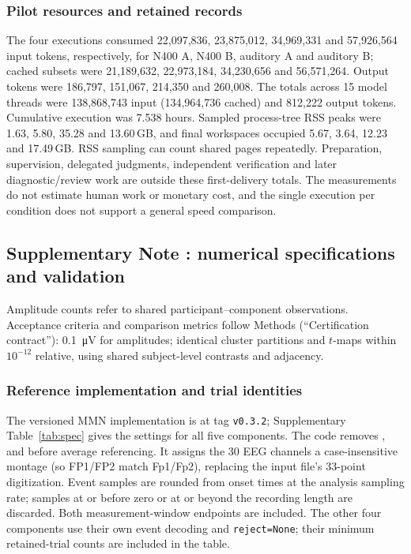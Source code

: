 \subsubsection*{Pilot resources and retained records}

The four executions consumed 22,097,836, 23,875,012, 34,969,331 and 57,926,564 input tokens, respectively, for N400 A, N400 B, auditory A and auditory B; cached subsets were 21,189,632, 22,973,184, 34,230,656 and 56,571,264. Output tokens were 186,797, 151,067, 214,350 and 260,008. The totals across 15 model threads were 138,868,743 input (134,964,736 cached) and 812,222 output tokens. Cumulative execution was 7.538 hours. Sampled process-tree RSS peaks were 1.63, 5.80, 35.28 and 13.60\,GB, and final workspaces occupied 5.67, 3.64, 12.23 and 17.49\,GB. RSS sampling can count shared pages repeatedly. Preparation, supervision, delegated judgments, independent verification and later diagnostic/review work are outside these first-delivery totals. The measurements do not estimate human work or monetary cost, and the single execution per condition does not support a general speed comparison.

\FloatBarrier
{}
\subsection*{Supplementary Note \thesuppnote: numerical specifications and validation}
\label{si:numerical}


Amplitude counts refer to shared participant--component observations. Acceptance criteria and comparison metrics follow Methods (``Certification contract''): \SI{0.1}{\uV} for amplitudes; identical cluster partitions and \(t\)-maps within \(10^{-12}\) relative, using shared subject-level contrasts and adjacency.

\subsubsection*{Reference implementation and trial identities}

The versioned MMN implementation is  at tag \texttt{v0.3.2}; Supplementary Table~\ref*{tab:spec} gives the settings for all five components. The code removes ,  and  before average referencing. It assigns the 30 EEG channels a case-insensitive  montage (so FP1/FP2 match Fp1/Fp2), replacing the input file's 33-point digitization. Event samples are rounded from onset times at the analysis sampling rate; samples at or before zero or at or beyond the recording length are discarded. Both measurement-window endpoints are included. The other four components use their own event decoding and \texttt{reject=None}; their minimum retained-trial counts are included in the table.

